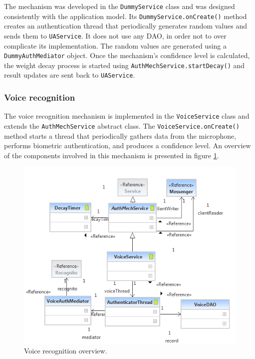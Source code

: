 The mechanism was developed in the {\tt DummyService} class and was designed consistently with the application model. Its {\tt DummyService.onCreate()} method creates an authentication thread that periodically generates random values and sends them to {\tt UAService}. It does not use any DAO, in order not to over complicate its implementation. The random values are generated using a {\tt DummyAuthMediator} object. Once the mechanism's confidence level is calculated, the weight decay process is started using {\tt AuthMechService.startDecay()} and result updates are sent back to {\tt UAService}.

\subsubsection{Voice recognition}
The voice recognition mechanism is implemented in the {\tt VoiceService} class and extends the {\tt AuthMechService} abstract class. The {\tt VoiceService.onCreate()} method starts a thread that periodically gathers data from the microphone, performs biometric authentication, and produces a confidence level. An overview of the components involved in this mechanism is presented in figure \ref{fig:voice}.
\begin{figure}[h]
    \centering
    \includegraphics[width=\textwidth]{Pictures/voice-brief}
    \caption{Voice recognition overview.}
    \label{fig:voice}
\end{figure}

